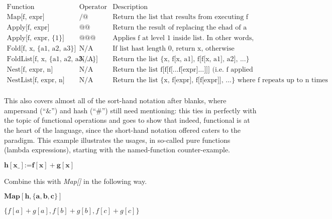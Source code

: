 \documentclass{article}
\begin{document}
\begin{doublespace}
\noindent\(\begin{array}{ccc}
 \text{Function} & \text{Operator} & \text{Description} \\
 \text{Map[f, expr]} & \text{/@} & \text{Return the list that results from executing f on each element of an expr} \\
 \text{Apply[f, expr]} & \text{@@} & \text{Return the result of replacing the ehad of a list with function f} \\
 \text{Apply[f, expr, $\{$1$\}$]} & \text{@@@} & \text{Applies f at level 1 inside list. In other words, replace the head of all elements} \\
 \text{Fold[f, x, $\{$a1, a2, a3$\}$]} & \text{N/A} & \text{If list hast length 0, return x, otherwise return f[f[f[x, a1], a2], a3]...} \\
 \text{FoldList[f, x, $\{$a1, a2, a3, ...$\}$]} & \text{N/A} & \text{Return the list $\{$x, f[x, a1], f[f[x, a1], a2], ...$\}$} \\
 \text{Nest[f, expr, n]} & \text{N/A} & \text{Return the list f[f[f[...f[expr]...]]] (i.e. f applied n times)} \\
 \text{NestList[f, expr, n]} & \text{N/A} & \text{Return the list $\{$x, f[expr], f[f[expr]], ...$\}$ where f repeats up to n times} \\
\end{array}\)
\end{doublespace}

This also covers almost all of the sort-hand notation after blanks, where ampersand ({``}$\&${''}) and hash ({``}$\#${''}) still need mentioning:
this ties in perfectly with the topic of functional operations and goes to show that indeed, functional is at the heart of the language, since the
short-hand notation offered caters to the paradigm. This example illustrates the usages, in so-called pure functions (lambda expressions), starting
with the named-function counter-example.

\begin{doublespace}
\noindent\(\pmb{h[\text{x$\_$}]\text{:=}f[x]+g[x]}\)
\end{doublespace}

Combine this with \textit{ Map[]} in the following way.

\begin{doublespace}
\noindent\(\pmb{\text{Map}[h,\{a,b,c\}]}\)
\end{doublespace}

\begin{doublespace}
\noindent\(\{f[a]+g[a],f[b]+g[b],f[c]+g[c]\}\)
\end{doublespace}
\end{document}
